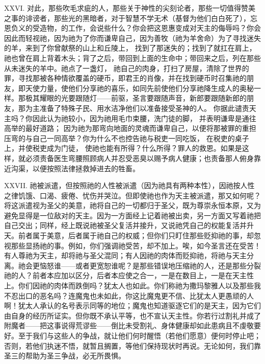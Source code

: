 XXVI. 对此，那些吹毛求疵的人，那些关于神性的尖刻论者，那些一切值得赞美之事的诽谤者，那些光的黑暗者，对于智慧不学无术（基督为他们白白死了），忘恩负义的受造物，的工作，会说些什么？你会把这恩惠变成对天主的侮辱吗？你会因此而轻视祂，因为祂为了你而谦卑自己，因为善牧（祂为羊舍命）为了寻找迷失的羊，来到了你曾献祭的山上和丘陵上， 找到了那迷失的；找到了就扛在肩上， 祂也曾在肩上背着木头；背了之后，带回到上面的生命中；带回来之后，列在那些从未迷失的羊中。祂点了一盏灯， 祂自己的肉身，打扫了房屋，清除了世界的罪，寻找那被各种情欲覆盖的硬币，即君王的肖像，并在找到硬币时召集祂的朋友，即天使力量，使他们分享祂的喜乐，如同先前使他们分享祂降生成人的奥秘一样。那极其耀眼的光要跟随灯——前驱，圣言要跟随声音，新郎要跟随新郎的朋友，那为主准备了特殊子民、用水洁净他们以准备接受圣神的人。 你据此谴责天主吗？你因此认为祂较小，因为祂用毛巾束腰，洗门徒的脚， 并表明谦卑是通往高举的最好道路； 因为祂为那弯向地面的灵魂而谦卑自己，以便将那被罪的重担压弯的与自己一同高举？你为什么不也控告祂与税吏一同吃饭， 在税吏的桌子上，并使税吏成为门徒， 使祂也能有所得？什么所得？罪人的救恩。如果是这样，就必须责备医生弯腰照顾病人并忍受恶臭以赐予病人健康；也责备那人俯身靠近沟渠，以便按照法律拯救掉进去的牲畜。\par

XXVII. 祂被派遣，但按照祂的人性被派遣（因为祂具有两种本性），因祂按人性之律饥饿、口渴、疲倦、忧伤并哭泣。但即使祂也作为天主被派遣，那又如何呢？将这派遣视为圣父的美意，祂将自己的一切都归于圣父，既为尊崇永恒本原，又为避免显得是一位敌对的天主。因为一方面经上记着祂被出卖，另一方面又写着祂把自己交出；同样，经上既说祂被圣父复活并接升，又说祂凭自己的权能复活并升天。前者属于美意，后者属于祂自己的权威；但你们只盯住那些贬抑祂的事，却忽视那些显扬祂的事。例如，你们强调祂受苦，却不加上。唉，如今圣言还在受苦！有人尊祂为天主，却将祂与圣父混同；有人因祂的肉体而贬抑祂，将祂与天主分离。祂会更恼怒谁——或者更宽恕谁呢？是那些错误地压缩祂的人，还是那些分裂祂的人？前者本应加以区分，后者本应使之合一，一是在数目上，一是在天主性上。你们因祂的肉体而跌倒吗？犹太人也如此。你们称祂为撒玛黎雅人以及那些我不忍出口的恶名吗？连魔鬼也未如此，你这比魔鬼更不信、比犹太人更愚顽的人啊！犹太人承认的名号表示同等的地位；魔鬼也知道驱逐它们的是天主，因为它们由自身的经历所证实。但你既不承认平等，也不宣认天主性。你若行过割礼并成了附魔者——把这事说得荒谬些——倒比未受割礼、身体健康却如此患病且不虔敬要好。至于我们与这些人的争战，就让他们何时醒悟（若他们愿意）便何时停止吧；否则，若他们执迷不悟，就暂且搁置，等他们保持现状时再说。无论如何，我们靠圣三的帮助为圣三争战，必无所畏惧。\par

